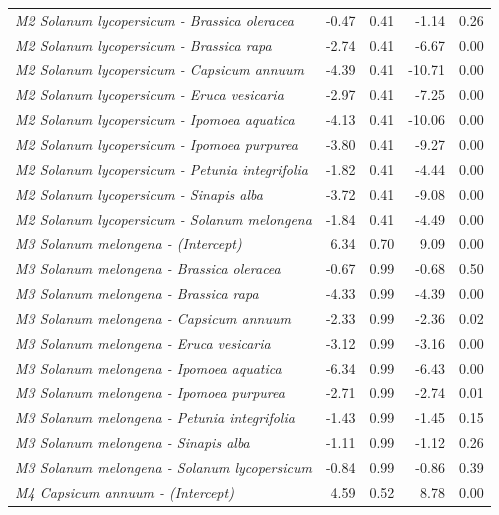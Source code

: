 \documentclass[
  12pt,
]{article}
\begin{document}
\begin{longtable}[t]{>{\em}lrrrr}
\addlinespace
M2 Solanum lycopersicum - Brassica oleracea & -0.47 & 0.41 & -1.14 & 0.26\\
\addlinespace
\rowcolor{gray!6}  M2 Solanum lycopersicum - Brassica rapa & -2.74 & 0.41 & -6.67 & 0.00\\
\addlinespace
M2 Solanum lycopersicum - Capsicum annuum & -4.39 & 0.41 & -10.71 & 0.00\\
\addlinespace
\rowcolor{gray!6}  M2 Solanum lycopersicum - Eruca vesicaria & -2.97 & 0.41 & -7.25 & 0.00\\
\addlinespace
M2 Solanum lycopersicum - Ipomoea aquatica & -4.13 & 0.41 & -10.06 & 0.00\\
\addlinespace
\rowcolor{gray!6}  M2 Solanum lycopersicum - Ipomoea purpurea & -3.80 & 0.41 & -9.27 & 0.00\\
\addlinespace
M2 Solanum lycopersicum - Petunia integrifolia & -1.82 & 0.41 & -4.44 & 0.00\\
\addlinespace
\rowcolor{gray!6}  M2 Solanum lycopersicum - Sinapis alba & -3.72 & 0.41 & -9.08 & 0.00\\
\addlinespace
M2 Solanum lycopersicum - Solanum melongena & -1.84 & 0.41 & -4.49 & 0.00\\
\addlinespace
\rowcolor{gray!6}  M3 Solanum melongena - (Intercept) & 6.34 & 0.70 & 9.09 & 0.00\\
\addlinespace
M3 Solanum melongena - Brassica oleracea & -0.67 & 0.99 & -0.68 & 0.50\\
\addlinespace
\rowcolor{gray!6}  M3 Solanum melongena - Brassica rapa & -4.33 & 0.99 & -4.39 & 0.00\\
\addlinespace
M3 Solanum melongena - Capsicum annuum & -2.33 & 0.99 & -2.36 & 0.02\\
\addlinespace
\rowcolor{gray!6}  M3 Solanum melongena - Eruca vesicaria & -3.12 & 0.99 & -3.16 & 0.00\\
\addlinespace
M3 Solanum melongena - Ipomoea aquatica & -6.34 & 0.99 & -6.43 & 0.00\\
\addlinespace
\rowcolor{gray!6}  M3 Solanum melongena - Ipomoea purpurea & -2.71 & 0.99 & -2.74 & 0.01\\
\addlinespace
M3 Solanum melongena - Petunia integrifolia & -1.43 & 0.99 & -1.45 & 0.15\\
\addlinespace
\rowcolor{gray!6}  M3 Solanum melongena - Sinapis alba & -1.11 & 0.99 & -1.12 & 0.26\\
\addlinespace
M3 Solanum melongena - Solanum lycopersicum & -0.84 & 0.99 & -0.86 & 0.39\\
\addlinespace
\rowcolor{gray!6}  M4 Capsicum annuum - (Intercept) & 4.59 & 0.52 & 8.78 & 0.00\\

\end{longtable}
\end{document}
